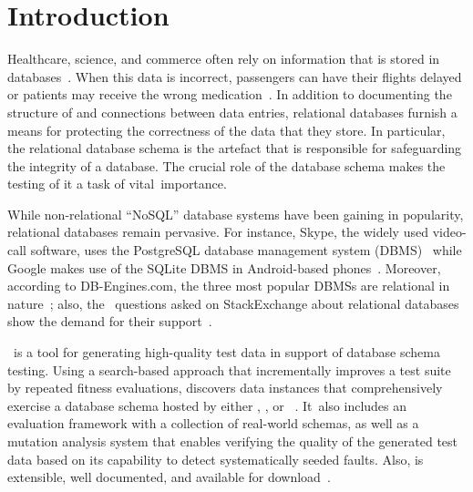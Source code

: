 \section{Introduction}\label{sec:intro}


Healthcare, science, and commerce often rely on information that is stored in
databases~\cite{kapfhammer2007comprehensive}.  When this data is incorrect, passengers can have their flights delayed or
patients may receive the wrong medication~\cite{databasebook}.  In addition to documenting the structure of and
connections between data entries, relational databases furnish a means for protecting the correctness of the data that
they store.  In particular, the relational database schema is the artefact that is responsible for safeguarding the
integrity of a database. The crucial role of the database schema makes the testing of it a task of \mbox{vital
importance}.


While non-relational ``NoSQL'' database systems have been gaining in popularity, relational databases remain pervasive.
For instance, Skype, the widely used video-call software, uses the PostgreSQL database management system
(DBMS)~\cite{postgres} while Google makes use of the SQLite DBMS in Android-based phones~\cite{sqlite}. Moreover,
according to DB-Engines.com, the three most popular DBMSs are relational in nature~\cite{dbrank}; also, the
\numquestions~questions asked on StackExchange about relational databases show the demand for their
support~\cite{stackexchange}.



\sa~is a tool for generating high-quality test data in support of database schema testing. Using a search-based approach
that incrementally improves a test suite by repeated fitness evaluations, {\sa} discovers data instances that
comprehensively exercise a database schema hosted by either \hypersql, \postgresql, or
\sqlite~\cite{mcminn2015effectiveness}. \mbox{It also} includes an evaluation framework with a collection of real-world
schemas, as well as a mutation analysis system that enables verifying the quality of the generated test data based on
its capability to detect systematically seeded faults. Also, {\sa} is extensible, well documented, and available for
download~\cite{tool}.

